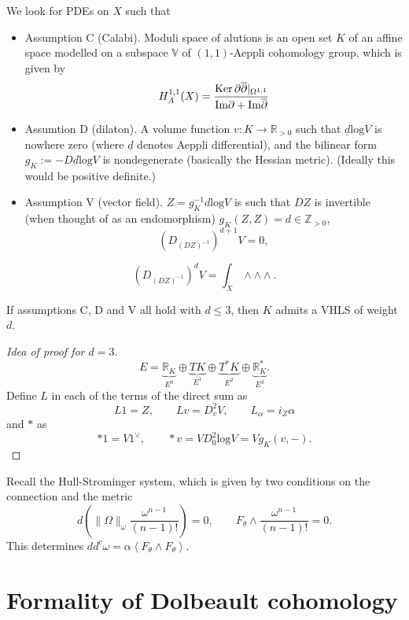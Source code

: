 We look for PDEs on  $X$ such that
\begin{itemize}
\item Assumption C (Calabi). Moduli
space of alutions is an open set $K$
of an affine space modelled on
a subspace $\mathbb{V}$ of
$(1,1)$-Aeppli cohomology group,
which is given by
$$
H^{1,1}_A(X)=\frac{\mathop{\mathrm{Ker}}
\partial\overline{\partial}|_{\Omega^{1,1}}}
{\text{Im}
\partial+\text{Im}\overline{\partial}}
$$

\item Assumtion D (dilaton).
A volume function $v:K\to \mathbb{R}_{>0}$
such that $\underline{d}\text{log} V$
is nowhere zero (where $\underline{d}$
denotes
Aeppli differential), and the bilinear form
$g_K:=-Dd \text{log}V$
is nondegenerate (basically the Hessian
metric).
(Ideally this would be positive definite.)

\item Assumption V (vector field).
$Z=g_K^{-1}d \text{log}V$
is such that $DZ$ is invertible
(when thought of as an endomorphism)
$g_K(Z,Z)=d \in \mathbb{Z}_{>0}$,
 $$
(D_{(DZ)^{-1}})^{d+1}V=0,
$$
\end{itemize}

\begin{remark}
\label{remark-pairing}
$$
(D_{(DZ)^{-1}})^dV=\int_X \wedge \wedge
\wedge.
$$
\end{remark}

\begin{theorem}
\label{theorem-GGA}
If assumptions C, D and V all hold with  $d
\leq 3$,
then $K$ admits a VHLS of weight $d$.
\end{theorem}

\begin{proof}[Idea of proof for $d=3$]
$$
E=\underbrace{\mathbb{R}_K}_{E^0} \oplus
\underbrace{TK}_{E^1}
\oplus \underbrace{T^*K}_{E^2} \oplus
\underbrace{\mathbb{R}_K^*}_{E^3}.
$$
Define $L$ in each of the terms of the direct
sum as
$$
L1=Z,\qquad Lv=D^2_vV,\qquad
L_\alpha=i_Z\alpha
$$
and $*$ as
$$
*1=V 1^\vee,\qquad  *v=VD^2_0
\text{log}V=Vg_K(v,-).
$$
\end{proof}

\medskip\noindent
Recall the Hull-Strominger
system, which is given by two conditions
on the connection and the metric
$$
d\left(\|\Omega\|_\omega
\frac{\omega^{n-1}}{(n-1)!}\right)=0,\qquad
F_\theta \wedge
\frac{\omega^{n-1}}{(n-1)!}=0.
$$
This determines $d
d^c\omega=\alpha\left\langle{}F_\theta \wedge
F_\theta\right\rangle{}$.

\section{Formality of Dolbeault cohomology}
\label{section-forma-dolbe-cohom}

